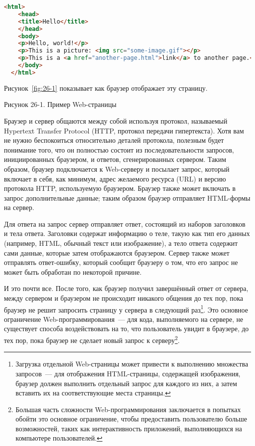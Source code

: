 \begin{lstlisting}[language=HTML]
  <html>
    <head>
    <title>Hello</title>
    </head>
    <body>
    <p>Hello, world!</p>
    <p>This is a picture: <img src="some-image.gif"></p>
    <p>This is a <a href="another-page.html">link</a> to another page.</p>
    </body>
  </html>
\end{lstlisting}

Рисунок~\ref{fig:26-1} показывает как браузер отображает эту страницу.

Рисунок 26-1. Пример Web-страницы

Браузер и сервер общаются между собой используя протокол, называемый Hypertext Transfer
Protocol (HTTP, протокол передачи гипертекста). Хотя вам не нужно беспокоиться
относительно деталей протокола, полезным будет понимание того, что он полностью состоит из
последовательности запросов, инициированных браузером, и ответов, сгенерированных
сервером. Таким образом, браузер подключается к Web-серверу и посылает запрос, который
включает в себя, как минимум, адрес желаемого ресурса (URL) и версию протокола HTTP,
используемую браузером. Браузер также может включать в запрос дополнительные данные; таким
образом браузер отправляет HTML-формы на сервер.

Для ответа на запрос сервер отправляет ответ, состоящий из наборов заголовков и тела
ответа. Заголовки содержат информацию о теле, такую как тип его данных (например, HTML,
обычный текст или изображение), а тело ответа содержит сами данные, которые затем
отображаются браузером. Сервер также может отправлять ответ-ошибку, который сообщит
браузеру о том, что его запрос не может быть обработан по некоторой причине.

И это почти все. После того, как браузер получил завершённый ответ от сервера, между
сервером и браузером не происходит никакого общения до тех пор, пока браузер не решит
запросить страницу у сервера в следующий раз\footnote{Загрузка отдельной Web-страницы
  может привести к выполнению множества запросов~--- для отображения HTML-страницы,
  содержащей изображения, браузер должен выполнить отдельный запрос для каждого из них, а
  затем вставить их на соответствующие места страницы.}. Это основное ограничение
Web-программирования~--- для кода, выполняемого на сервере, не существует способа
воздействовать на то, что пользователь увидит в браузере, до тех пор, пока браузер не
сделает новый запрос к серверу\footnote{Большая часть сложности Web-программирования
  заключается в попытках обойти это основное ограничение, чтобы предоставить пользователю
  больше возможностей, таких как интерактивность приложений, выполняющихся на компьютере
  пользователей.}.


